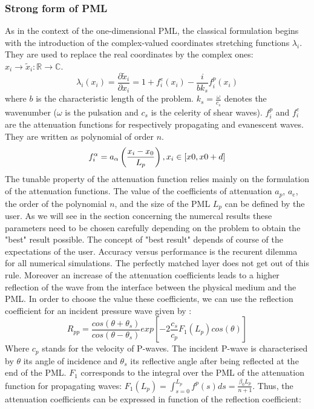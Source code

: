 \subsubsection{Strong form of PML}
\par As in the context of the one-dimensional PML, the classical formulation begins with the introduction of the complex-valued coordinates stretching functions $\lambda_i$. They are used to replace the real coordinates by the complex ones: $x_i \rightarrow \tilde{x}_i: \mathbb{R} \rightarrow \mathbb{C}$. 
\begin{equation}
\lambda_i(x_i) = \frac{\partial \tilde{x}_i}{\partial x_i} = 1+f^e_i(x_i)-\frac{i}{b k_s} f^p_i(x_i)
\label{eq:complex-stret-2D}
\end{equation} 
where $b$ is the characteristic length of the problem. $k_s=\frac{\omega}{c_s}$ denotes the wavenumber ($\omega$ is the pulsation and $c_s$ is the celerity of shear waves). $f^p_i$ and $f^e_i$ are the attenuation functions for respectively propagating and evanescent waves. They are written as polynomial of order $n$. 
\begin{equation}
f^\alpha_i = a_\alpha \left(\frac{x_i - x_0}{L_p}  \right), x_i \in [x0,x0+d] \\
\label{eq:attenuation-functions}
\end{equation}
The tunable property of the attenuation function relies mainly on the formulation of the attenuation functions. The value of the coefficients of attenuation $a_p$, $a_e$, the order of the polynomial $n$, and the size of the PML $L_p$ can be defined by the user. As we will see in the section concerning the numercal results these parameters need to be chosen carefully depending on the problem to obtain the "best" result possible. The concept of "best result" depends of course of the expectations of the user. Accuracy versus performance is the recurent dilemma for all numerical simulations. The perfectly matched layer does not get out of this rule. Moreover an increase of the attenuation coefficients leads to a higher reflection of the wave from the interface between the physical medium and the PML. In order to choose the value these coefficients, we can use the reflection coefficient for an incident pressure wave given by \cite{Basu2004}:
\begin{equation}
R_{pp} = \frac{cos(\theta+\theta_s)}{cos(\theta-\theta_s)} exp\left[-2\frac{c_s}{c_p}F_1(L_p)cos(\theta)\right]
\label{eq:Rpp} 
\end{equation} 
Where $c_p$ stands for the velocity of P-waves. The incident P-wave is characterised by $\theta$ its angle of incidence and $\theta_s$ its reflective angle after being reflected at the end of the PML. $F_1$ corresponds to the integral over the PML of the attenuation function for propagating waves: $F_1(L_p) = \int_{s=0}^{L_p} f^p(s) ds = \frac{\beta_0 L_p}{n+1}$. Thus, the attenuation coefficients can be expressed in function of the reflection coefficient:
